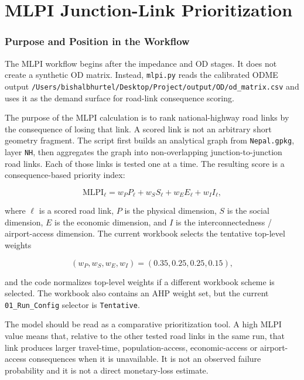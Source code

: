 \documentclass[11pt,a4paper]{article}
\begin{document}
\part{MLPI Junction-Link Prioritization}

\section{Purpose and Position in the Workflow}

The MLPI workflow begins after the impedance and OD stages. It does not create
a synthetic OD matrix. Instead, \texttt{mlpi.py} reads the calibrated ODME output
\texttt{/Users/bishalbhurtel/Desktop/Project/output/OD/od\_matrix.csv} and
uses it as the demand surface for road-link consequence scoring.

The purpose of the MLPI calculation is to rank national-highway road links by
the consequence of losing that link. A scored link is not an arbitrary short
geometry fragment. The script first builds an analytical graph from
\texttt{Nepal.gpkg}, layer \texttt{NH}, then aggregates the graph into
non-overlapping junction-to-junction road links. Each of those links is tested
one at a time. The resulting score is a consequence-based priority index:

\begin{equation}
\mathrm{MLPI}_{\ell}
=w_P P_{\ell}+w_S S_{\ell}+w_E E_{\ell}+w_I I_{\ell},
\label{eq:mlpi-final}
\end{equation}

where $\ell$ is a scored road link, $P$ is the physical dimension, $S$ is the
social dimension, $E$ is the economic dimension, and $I$ is the
interconnectedness / airport-access dimension. The current workbook selects
the tentative top-level weights

\begin{equation}
(w_P,w_S,w_E,w_I)=(0.35,0.25,0.25,0.15),
\end{equation}

and the code normalizes top-level weights if a different workbook scheme is
selected. The workbook also contains an AHP weight set, but the current
\texttt{01\_Run\_Config} selector is \texttt{Tentative}.

The model should be read as a comparative prioritization tool. A high MLPI
value means that, relative to the other tested road links in the same run, that
link produces larger travel-time, population-access, economic-access or
airport-access consequences when it is unavailable. It is not an observed
failure probability and it is not a direct monetary-loss estimate.
\end{document}
